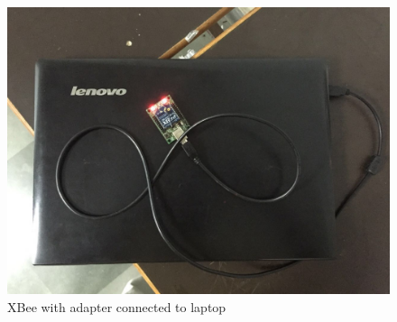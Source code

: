 \documentclass[a4paper,12pt,oneside]{book}
\begin{document}
\begin{itemize}
\begin{enumerate}
    \begin{figure}[!ht]
        \centering
        \includegraphics[scale=0.15]{adapter_board}
        \caption{XBee with adapter connected to laptop}
      \end{figure}
  \end{enumerate}


\end{itemize}
\end{document}
